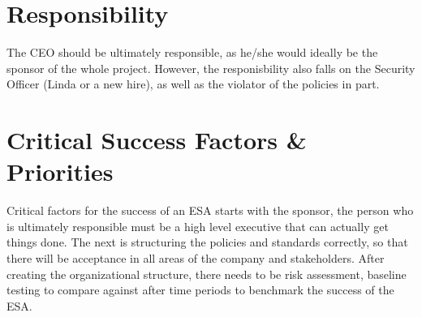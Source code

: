 \documentclass{article}
\begin{document}
\section{Responsibility}
The CEO should be ultimately responsible, as he/she would ideally be the sponsor of the whole project.  However, the responisbility also falls on the Security Officer (Linda or a new hire), as well as the violator of the policies in part.  

\section{Critical Success Factors & Priorities}
Critical factors for the success of an ESA starts with the sponsor, the person who is ultimately responsible must be a high level executive that can actually get things done.  The next is structuring the policies and standards correctly, so that there will be acceptance in all areas of the company and stakeholders.  After creating the organizational structure, there needs to be risk assessment, baseline testing to compare against after time periods to benchmark the success of the ESA.
\end{document}
